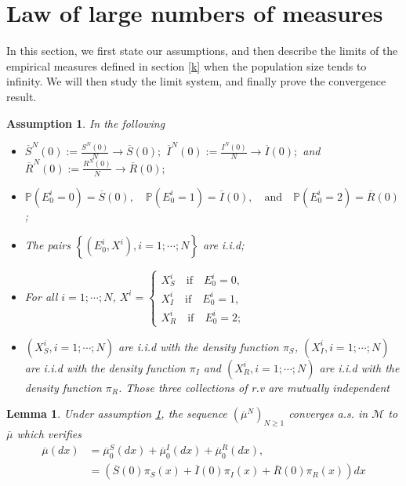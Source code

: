 \documentclass[notitlepage,reqno,11pt]{amsart}
\numberwithin{equation}{section}
\newtheorem{assumption}{Assumption}[section]
\newtheorem{lemma}{Lemma}[section]
\def\P{\mathbb{P}}
\begin{document}
\section{Law of large numbers of measures}
\label{kk}
In this section, we first state our assumptions, and then describe the limits of the empirical measures defined in section \ref{k} when the population size tends to infinity. We will then study the limit system, and finally prove the convergence result.
\begin{assumption}
	\label{ass1}
In the following
\begin{itemize}
\item $\overline{S}^N(0):=\frac{S^N(0)}{N}\rightarrow\overline{S}(0);$  $\overline{I}^N(0):=\frac{I^N(0)}{N}\rightarrow\overline{I}(0);$ and $\overline{R}^N(0):=\frac{R^N(0)}{N}\rightarrow\overline{R}(0);$
\item $\displaystyle \P(E^i_0=0)=\overline{S}(0),\quad \P(E^i_0=1)=\overline{I}(0), \quad \text{and}\quad \P(E^i_0=2)=\overline{R}(0)$;
\item The pairs $\left\{\left(E^{i}_0, X^i\right), i=1;\cdots;N\right\}$ are i.i.d;
\item For all $i=1;\cdots;N$, $X^i=\begin{cases}
X_S^i\quad \text{if}\quad E^i_0=0,\\
X_I^i\quad \text{if}\quad E^i_0=1,\\
X_R^i\quad \text{if}\quad E^i_0=2;
\end{cases}$
\item $\left(X_S^i, i=1;\cdots;N\right)$ are  i.i.d with the density function $\pi_S$, $\left(X_I^i, i=1;\cdots;N\right)$ are  i.i.d with the density function $\pi_I$ and $\left(X_R^i, i=1;\cdots;N\right)$  are i.i.d with the density function $\pi_R$. Those three collections of r.v are mutually independent
\end{itemize}
\end{assumption}
\begin{lemma}
\label{Lem1}
Under assumption \ref{ass1}, the sequence $(\overline{\mu}^{N})_{N \geq 1}$ converges a.s. in  $\mathcal{M}$ to $\overline{\mu}$ which verifies
\begin{align}
\overline{\mu}(dx)&=\overline{\mu}^S_0(dx)+\overline{\mu}^I_0(dx)+\overline{\mu}^R_0(dx),\nonumber\\
&= \left(\overline{S}(0)\pi_S(x)+\overline{I}(0)\pi_I(x)+\overline{R}(0)\pi_R(x)\right)dx
\end{align}
\end{lemma}
\end{document}
